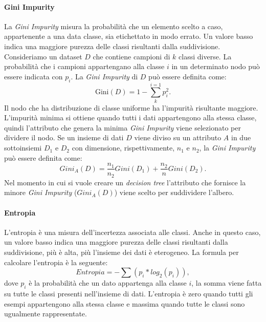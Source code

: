 \documentclass[12pt,italian]{report}
\begin{document}
	\paragraph{Gini Impurity}
	La \textit{Gini Impurity} misura la probabilità che un elemento scelto a caso, appartenente a una data classe, sia etichettato in modo errato. Un valore basso indica una maggiore purezza delle classi risultanti dalla suddivisione. Consideriamo un dataset $D$ che contiene
	campioni di $k$ classi diverse. La probabilità che i campioni appartengano alla classe $i$ in un determinato nodo può essere indicata con $p_i$. La \textit{Gini Impurity} di $D$ può essere definita come:
	\begin{equation}
		\text{Gini}(D) = 1- \sum_{k}^{i=1} p_{i}^2.
	\end{equation}
	Il nodo che ha distribuzione di classe uniforme ha l'impurità risultante maggiore. L'impurità minima si ottiene quando tutti i dati appartengono alla stessa classe, quindi l'attributo che genera la minima \textit{Gini Impurity} viene selezionato per dividere il nodo. Se un insieme di dati $D$ viene diviso su un attributo $A$ in due sottoinsiemi $D_1$ e $D_2$ con dimensione, rispettivamente, $n_1$ e $n_2$, la \textit{Gini Impurity} può essere definita come:
	\begin{equation}
		Gini_A(D) = \frac{n_1}{n_2}Gini(D_1) + \frac{n_2}{n}Gini(D_2).
	\end{equation}
	Nel momento in cui si vuole creare un \textit{decision tree} l'attributo che fornisce la minore \textit{Gini Impurity} ($Gini_A(D)$) viene scelto per suddividere l'albero. 
	
	\paragraph{Entropia}
	L'entropia è una misura dell'incertezza associata alle classi. Anche in questo caso, un valore basso indica una maggiore purezza delle classi risultanti dalla suddivisione, più è alta, più l'insieme dei dati è eterogeneo. La formula per calcolare l'entropia è la seguente:
	\begin{equation}
		Entropia = -\sum (p_i * log_2(p_i)),
	\end{equation}
	dove $p_i$ è la probabilità che un dato appartenga alla classe $i$, la somma viene fatta su tutte le classi presenti nell'insieme di dati. L'entropia è zero quando tutti gli esempi appartengono alla stessa classe e massima quando tutte le classi sono ugualmente rappresentate. 
	
\end{document}
